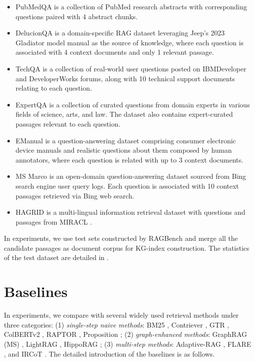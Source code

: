\begin{itemize}
    \item PubMedQA \citep{jin-etal-2019-pubmedqa} is a collection of PubMed research abstracts with corresponding questions paired with 4 abstract chunks.
    \item  DelucionQA \citep{sadat-etal-2023-delucionqa} is a domain-specific RAG dataset leveraging Jeep’s 2023 Gladiator model manual as the source of knowledge, where each question is associated with 4 context documents and only 1 relevant passage.
    \item TechQA \citep{castelli-etal-2020-techqa} is a collection of real-world user questions posted on IBMDeveloper and DeveloperWorks forums, along with 10 technical support documents relating to each question.
    \item ExpertQA \citep{malaviya2023expertqa} is a collection of curated questions from domain experts in various fields of science, arts, and law. The dataset also contains expert-curated passages relevant to each question.
    \item EManual \citep{nandy-etal-2021-question-answering} is a question-answering dataset comprising consumer electronic device manuals and realistic questions about them composed by human annotators, where each question is related with up to 3 context documents.
     \item MS Marco \citep{nguyen2016ms} is an open-domain question-answering dataset sourced from Bing search engine user query logs. Each question is associated with 10 context passages retrieved via Bing web search.
    \item HAGRID \citep{kamalloo2023hagrid} is a multi-lingual information retrieval dataset with questions and passages from MIRACL \citep{zhang2022making}.
\end{itemize}
In experiments, we use test sets constructed by RAGBench \citep{friel2024ragbench} and merge all the candidate passages as document corpus for KG-index construction. The statistics of the test dataset are detailed in .

\section{Baselines}\label{app:baselines}
In experiments, we compare with several widely used retrieval methods under three categories: (1) \emph{single-step naive methods}: BM25 \citep{robertson1994some}, Contriever \citep{izacardunsupervised}, GTR \citep{ni2022large}, ColBERTv2 \citep{santhanam2022colbertv2}, RAPTOR \citep{sarthiraptor}, Proposition \citep{chen-etal-2024-dense}; (2) \emph{graph-enhanced methods}: GraphRAG (MS) \citep{edge2024local}, LightRAG \citep{guo2024lightrag}, HippoRAG \citep{gutiérrez2024hipporag}; (3) \emph{multi-step methods}: Adaptive-RAG \citep{jeong2024adaptive}, FLARE \citep{jiang2023active}, and IRCoT \citep{trivedi2023interleaving}. The detailed introduction of the baselines is as follows.

